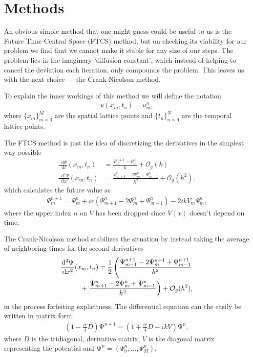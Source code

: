 \documentclass[10pt,a4paper,twocolumn]{article}
\renewcommand{\vec}[1]{\bm{\mathrm{#1}}}
\newcommand{\diff}{\mathop{}\!\mathrm{d}}
\begin{document}
\section{Methods}

An obvious simple method that one might guess could be useful to us is the Future Time Central Space (FTCS) method, but on checking its viability for our problem we find that we cannot make it stable for any size of our steps. The problem lies in the imaginary `diffusion constant', which instead of helping to cancel the deviation each iteration, only compounds the problem. This leaves us with the next choice --- the Crank-Nicolson method.

To explain the inner workings of this method we will define the notation
%
\begin{align}
    u(x_m, t_n) = u_m^n,
\end{align}
%
where $\{x_m\}_{m=0}^{M}$ are the spatial lattice points and $\{t_n\}_{n=0}^{N}$ are the temporal lattice points.

The FTCS method is just the idea of discretizing the derivatives in the simplest way possible
%
\begin{align}
    \frac{\diff \Psi}{\diff t}(x_m, t_n) &= \frac{\Psi_m^{n+1} - \Psi_m^n}{k} + \mathcal{O}_g(k) \\
    \frac{\diff^2 \Psi}{\diff x^2}(x_m, t_n) &= \frac{\Psi_{m+1}^n - 2 \Psi_m^n + \Psi_{m-1}^n}{h^2} + \mathcal{O}_g(h^2),
\end{align}
%
which calculates the future value as
%
\begin{align}
    \Psi_m^{n+1} = \Psi_m^n + i r (\Psi_{m+1}^n - 2 \Psi_m^n + \Psi_{m-1}^n) - 2 i k V_m \Psi_m^n,
\end{align}
%
where the upper index $n$ on $V$ has been dropped since $V(x)$ doesn't depend on time.

The Crank-Nicolson method stabilizes the situation by instead taking the average of neighboring times for the second derivatives
%
\begin{align}
    \frac{\diff^2 \Psi}{\diff x^2}(x_m, t_n) = \frac{1}{2} \left( \frac{\Psi_{m+1}^{n+1} - 2 \Psi_m^{n+1} + \Psi_{m-1}^{n+1}}{h^2} \right. \notag\\
     + \left. \frac{\Psi_{m+1}^n - 2 \Psi_m^n + \Psi_{m-1}^n}{h^2} \right) + \mathcal{O}_g(h^2),
\end{align}
%
in the process forfeiting explicitness. The differential equation can the easily be written in matrix form
%
\begin{align}
    \left(1 - \frac{i r}{4} D \right) \vec{\Psi}^{n+1} = \left(1 + \frac{i r}{4} D - i k V\right) \vec{\Psi}^n,
\end{align}
%
where $D$ is the tridiagonal, derivative matrix, $V$ is the diagonal matrix representing the potential and $\vec{\Psi}^n = (\Psi_0^n, \dots, \Psi_M^n)$.
\end{document}
